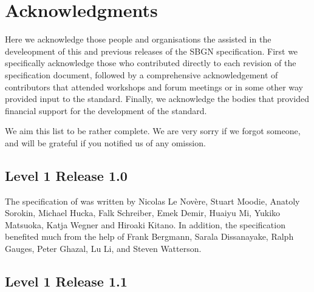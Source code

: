 \chapter{Acknowledgments}\label{sec:acknowledgments}

Here we acknowledge those people and organisations the assisted in the develeopment of this and previous releases of the SBGN \PDl specification. First we specifically acknowledge those who contributed directly to each revision of the  specification document, followed by a comprehensive acknowledgement of contributors that attended workshops and forum meetings or in some other way provided input to the standard. Finally, we acknowledge the bodies that provided financial support for the development of the standard.


 We aim this list to be rather complete. We are very sorry if we forgot someone, and will be grateful if you notified us of any omission.

\section{Level 1 Release 1.0}

The specification of was written by Nicolas Le Nov\`{e}re, 
Stuart Moodie, Anatoly Sorokin, Michael Hucka, Falk Schreiber, Emek Demir, 
Huaiyu Mi, Yukiko Matsuoka, Katja Wegner and Hiroaki Kitano. In addition, 
the specification benefited much from the help of Frank Bergmann, Sarala 
Dissanayake, Ralph Gauges, Peter Ghazal, Lu Li, and Steven Watterson.


\section{Level 1 Release 1.1}

